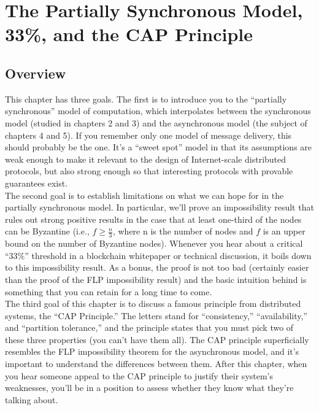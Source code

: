 \chapter{The Partially Synchronous Model, 33\%, and the CAP Principle}
\section{Overview}
This chapter has three goals. The first is to introduce you to the “partially synchronous”
model of computation, which interpolates between the synchronous model (studied in chapters 2 and 3) and the asynchronous model (the subject of chapters 4 and 5). If you
remember only one model of message delivery, this should probably be the one. It’s a “sweet
spot” model in that its assumptions are weak enough to make it relevant to the design of
Internet-scale distributed protocols, but also strong enough so that interesting protocols with
provable guarantees exist.\\
The second goal is to establish limitations on what we can hope for in the partially
synchronous model. In particular, we’ll prove an impossibility result that rules out strong
positive results in the case that at least one-third of the nodes can be Byzantine (i.e., $f \geq \frac{n}{3}$,
where n is the number of nodes and $f$ is an upper bound on the number of Byzantine nodes).
Whenever you hear about a critical “33\%” threshold in a blockchain whitepaper or technical
discussion, it boils down to this impossibility result. As a bonus, the proof is not too bad
(certainly easier than the proof of the FLP impossibility result) and the basic intuition
behind is something that you can retain for a long time to come.\\
The third goal of this chapter is to discuss a famous principle from distributed systems,
the “CAP Principle.” The letters stand for “consistency,” “availability,” and “partition tolerance,” and the principle states that you must pick two of these three properties (you can’t
have them all). The CAP principle superficially resembles the FLP impossibility theorem
for the asynchronous model, and it’s important to understand the differences between them.
After this chapter, when you hear someone appeal to the CAP principle to justify their
system’s weaknesses, you’ll be in a position to assess whether they know what they’re talking
about.\\

